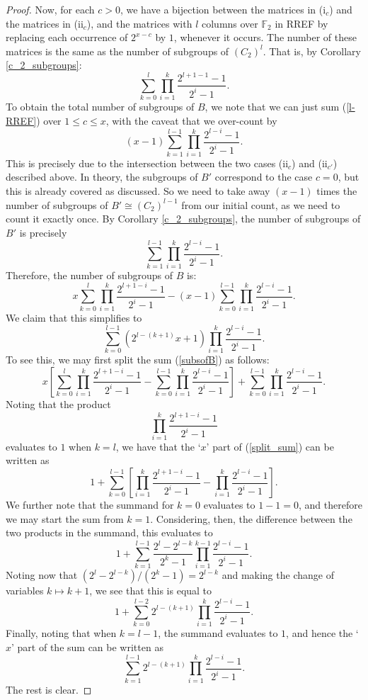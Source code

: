 \documentclass[a4paper,reqno]{amsart}
\theoremstyle{definition}
\begin{document}
\begin{proof}
    Now, for each $c>0$, we have a bijection between the matrices in (i$_c$) and the matrices in (ii$_c$), and the matrices with $l$ columns over $\mathbb{F}_2$ in RREF by replacing each occurrence of $2^{x-c}$ by $1$, whenever it occurs. The number of these matrices is the same as the number of subgroups of $(C_2)^l$. That is, by Corollary \ref{c_2_subgroups}:
    \begin{equation}\label{l-RREF}
        \sum_{k=0}^l\prod_{i=1}^k\frac{2^{l+1-1}-1}{2^i-1}.
    \end{equation}
    To obtain the total number of subgroups of $B$, we note that we can just sum (\ref{l-RREF}) over $1 \leq c \leq x$, with the caveat that we over-count by
    \[(x-1)\sum_{k=1}^{l-1}\prod_{i=1}^k\frac{2^{l-i}-1}{2^i-1}.\]
    This is precisely due to the intersection between the two cases (ii$_c$) and (ii$_{c'}$) described above. In theory, the subgroups of $B'$ correspond to the case $c=0$, but this is already covered as discussed. So we need to take away $(x-1)$ times the number of subgroups of $B' \cong (C_2)^{l-1}$ from our initial count, as we need to count it exactly once. By Corollary \ref{c_2_subgroups}, the number of subgroups of $B'$ is precisely
    \[\sum_{k=1}^{l-1}\prod_{i=1}^k\frac{2^{l-i}-1}{2^i-1}.\]
    Therefore, the number of subgroups of $B$ is:
    \begin{equation}\label{subsofB}
        x\sum_{k=0}^l\prod_{i=1}^k\frac{2^{l+1-i}-1}{2^i-1}-(x-1)\sum_{k=0}^{l-1}\prod_{i=1}^k\frac{2^{l-i}-1}{2^i-1}.
    \end{equation}
    We claim that this simplifies to
    \[\sum_{k=0}^{l-1}(2^{l-(k+1)}x+1)\prod_{i=1}^k\frac{2^{l-i}-1}{2^i-1}.\]
    To see this, we may first split the sum (\ref{subsofB}) as follows:
    \begin{equation}\label{split_sum}
        x\left[\sum_{k=0}^l\prod_{i=1}^k\frac{2^{l+1-i}-1}{2^i-1}-\sum_{k=0}^{l-1}\prod_{i=1}^k\frac{2^{l-i}-1}{2^i-1}\right]+\sum_{k=0}^{l-1}\prod_{i=1}^k\frac{2^{l-i}-1}{2^i-1}.
    \end{equation}
    Noting that the product
    \[\prod_{i=1}^k\frac{2^{l+1-i}-1}{2^i-1}\]
    evaluates to $1$ when $k=l$, we have that the `$x$' part of (\ref{split_sum}) can be written as
    \[1+\sum_{k=0}^{l-1}\left[\prod_{i=1}^k\frac{2^{l+1-i}-1}{2^i-1}-\prod_{i=1}^k\frac{2^{l-i}-1}{2^i-1}\right].\]
    We further note that the summand for $k=0$ evaluates to $1-1=0$, and therefore we may start the sum from $k=1$. Considering, then, the difference between the two products in the summand, this evaluates to
    \[1+\sum_{k=1}^{l-1}\frac{2^l-2^{l-k}}{2^k-1}\prod_{i=1}^{k-1}\frac{2^{l-i}-1}{2^i-1}.\]
    Noting now that $(2^l-2^{l-k})/(2^k-1)=2^{l-k}$ and making the change of variables $k \mapsto k+1$, we see that this is equal to
    \[1+\sum_{k=0}^{l-2}2^{l-(k+1)}\prod_{i=1}^k\frac{2^{l-i}-1}{2^i-1}.\]
    Finally, noting that when $k=l-1$, the summand evaluates to $1$, and hence the `$x$' part of the sum can be written as
    \[\sum_{k=1}^{l-1}2^{l-(k+1)}\prod_{i=1}^k\frac{2^{l-i}-1}{2^i-1}.\]
    The rest is clear.
\end{proof}
\end{document}
